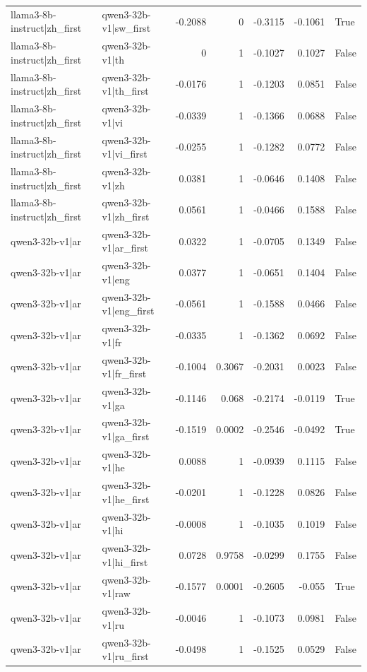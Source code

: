 \begin{table}
\begin{tabular}{l l r r r r l}
llama3-8b-instruct|zh_first & qwen3-32b-v1|sw_first & -0.2088 & 0 & -0.3115 & -0.1061 & True \\
llama3-8b-instruct|zh_first & qwen3-32b-v1|th & 0 & 1 & -0.1027 & 0.1027 & False \\
llama3-8b-instruct|zh_first & qwen3-32b-v1|th_first & -0.0176 & 1 & -0.1203 & 0.0851 & False \\
llama3-8b-instruct|zh_first & qwen3-32b-v1|vi & -0.0339 & 1 & -0.1366 & 0.0688 & False \\
llama3-8b-instruct|zh_first & qwen3-32b-v1|vi_first & -0.0255 & 1 & -0.1282 & 0.0772 & False \\
llama3-8b-instruct|zh_first & qwen3-32b-v1|zh & 0.0381 & 1 & -0.0646 & 0.1408 & False \\
llama3-8b-instruct|zh_first & qwen3-32b-v1|zh_first & 0.0561 & 1 & -0.0466 & 0.1588 & False \\
qwen3-32b-v1|ar & qwen3-32b-v1|ar_first & 0.0322 & 1 & -0.0705 & 0.1349 & False \\
qwen3-32b-v1|ar & qwen3-32b-v1|eng & 0.0377 & 1 & -0.0651 & 0.1404 & False \\
qwen3-32b-v1|ar & qwen3-32b-v1|eng_first & -0.0561 & 1 & -0.1588 & 0.0466 & False \\
qwen3-32b-v1|ar & qwen3-32b-v1|fr & -0.0335 & 1 & -0.1362 & 0.0692 & False \\
qwen3-32b-v1|ar & qwen3-32b-v1|fr_first & -0.1004 & 0.3067 & -0.2031 & 0.0023 & False \\
qwen3-32b-v1|ar & qwen3-32b-v1|ga & -0.1146 & 0.068 & -0.2174 & -0.0119 & True \\
qwen3-32b-v1|ar & qwen3-32b-v1|ga_first & -0.1519 & 0.0002 & -0.2546 & -0.0492 & True \\
qwen3-32b-v1|ar & qwen3-32b-v1|he & 0.0088 & 1 & -0.0939 & 0.1115 & False \\
qwen3-32b-v1|ar & qwen3-32b-v1|he_first & -0.0201 & 1 & -0.1228 & 0.0826 & False \\
qwen3-32b-v1|ar & qwen3-32b-v1|hi & -0.0008 & 1 & -0.1035 & 0.1019 & False \\
qwen3-32b-v1|ar & qwen3-32b-v1|hi_first & 0.0728 & 0.9758 & -0.0299 & 0.1755 & False \\
qwen3-32b-v1|ar & qwen3-32b-v1|raw & -0.1577 & 0.0001 & -0.2605 & -0.055 & True \\
qwen3-32b-v1|ar & qwen3-32b-v1|ru & -0.0046 & 1 & -0.1073 & 0.0981 & False \\
qwen3-32b-v1|ar & qwen3-32b-v1|ru_first & -0.0498 & 1 & -0.1525 & 0.0529 & False \\

\end{tabular}
\end{table}
